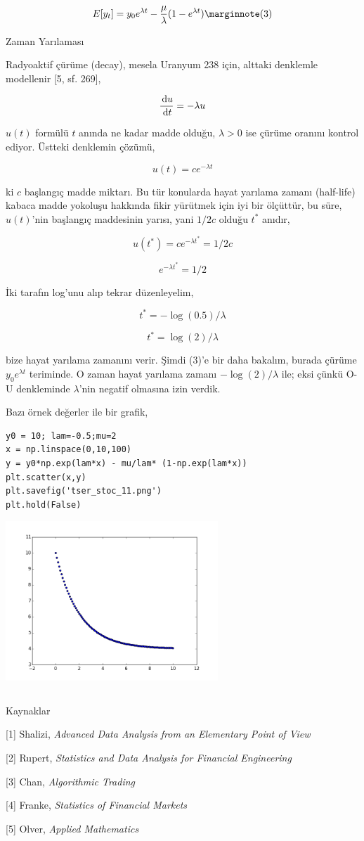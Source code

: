 \documentclass[12pt,fleqn]{article}\usepackage{../../common}
\begin{document}
$$ 
E[y_t] = y_0 e^{\lambda t} - \frac{\mu}{\lambda} ( 1 - e^{\lambda t}) 
\mlabel{3}
$$

Zaman Yarılaması

Radyoaktif çürüme (decay), mesela Uranyum 238 için, alttaki denklemle
modellenir [5, sf. 269],

$$ \frac{\,\mathrm{d} u}{\,\mathrm{d} t} = - \lambda u$$

$u(t)$ formülü $t$ anında ne kadar madde olduğu, $\lambda > 0$ ise çürüme
oranını kontrol ediyor. Üstteki denklemin çözümü,

$$ u(t) = c e^{-\lambda t} $$

ki $c$ başlangıç madde miktarı. Bu tür konularda hayat yarılama zamanı
(half-life) kabaca madde yokoluşu hakkında fikir yürütmek için iyi bir ölçüttür,
bu süre, $u(t)$'nin başlangıç maddesinin yarısı, yani $1/2 c$ olduğu $t^\ast$
anıdır,


$$ u(t^\ast) = c e^{-\lambda t^\ast} = 1/2 c$$

$$  e^{-\lambda t^\ast} = 1/2 $$

İki tarafın log'unu alıp tekrar düzenleyelim,

$$ t^\ast = -\log(0.5)/\lambda $$

$$ t^\ast  = \log(2)/\lambda $$

bize hayat yarılama zamanını verir. Şimdi (3)'e bir daha bakalım, burada çürüme
$y_0 e^{\lambda t}$ teriminde. O zaman hayat yarılama zamanı $-\log(2)/\lambda$
ile; eksi çünkü O-U denkleminde $\lambda$'nin negatif olmasına izin verdik.

Bazı örnek değerler ile bir grafik,

\begin{verbatim}
y0 = 10; lam=-0.5;mu=2
x = np.linspace(0,10,100)
y = y0*np.exp(lam*x) - mu/lam* (1-np.exp(lam*x))
plt.scatter(x,y)
plt.savefig('tser_stoc_11.png')
plt.hold(False)
\end{verbatim}

\includegraphics[height=6cm]{tser_stoc_11.png}

\inputminted[fontsize=\footnotesize]{python}{halflife.py}

Kaynaklar 

[1] Shalizi, {\em Advanced Data Analysis from an Elementary Point of View}

[2] Rupert, {\em Statistics and Data Analysis for Financial Engineering}

[3] Chan, {\em Algorithmic Trading}

[4] Franke, {\em Statistics of Financial Markets}

[5] Olver, {\em Applied Mathematics}
\end{document}
